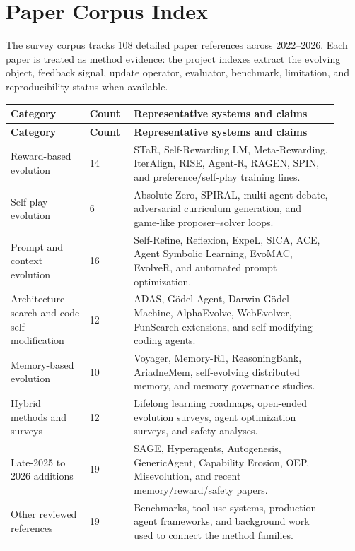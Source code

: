 \section{Paper Corpus Index}
\label{app:papers}

The survey corpus tracks 108 detailed paper references across 2022--2026. Each paper is treated as method evidence: the project indexes extract the evolving object, feedback signal, update operator, evaluator, benchmark, limitation, and reproducibility status when available.

{\TableTight
\begin{longtable}{@{}L{0.22\linewidth}L{0.12\linewidth}L{0.58\linewidth}@{}}
\toprule
\textbf{Category} & \textbf{Count} & \textbf{Representative systems and claims} \\
\midrule
\endfirsthead
\toprule
\textbf{Category} & \textbf{Count} & \textbf{Representative systems and claims} \\
\midrule
\endhead
\bottomrule
\endlastfoot
Reward-based evolution & 14 & STaR, Self-Rewarding LM, Meta-Rewarding, IterAlign, RISE, Agent-R, RAGEN, SPIN, and preference/self-play training lines. \\
Self-play evolution & 6 & Absolute Zero, SPIRAL, multi-agent debate, adversarial curriculum generation, and game-like proposer--solver loops. \\
Prompt and context evolution & 16 & Self-Refine, Reflexion, ExpeL, SICA, ACE, Agent Symbolic Learning, EvoMAC, EvolveR, and automated prompt optimization. \\
Architecture search and code self-modification & 12 & ADAS, G\"{o}del Agent, Darwin G\"{o}del Machine, AlphaEvolve, WebEvolver, FunSearch extensions, and self-modifying coding agents. \\
Memory-based evolution & 10 & Voyager, Memory-R1, ReasoningBank, AriadneMem, self-evolving distributed memory, and memory governance studies. \\
Hybrid methods and surveys & 12 & Lifelong learning roadmaps, open-ended evolution surveys, agent optimization surveys, and safety analyses. \\
Late-2025 to 2026 additions & 19 & SAGE, Hyperagents, Autogenesis, GenericAgent, Capability Erosion, OEP, Misevolution, and recent memory/reward/safety papers. \\
Other reviewed references & 19 & Benchmarks, tool-use systems, production agent frameworks, and background work used to connect the method families. \\
\end{longtable}}

